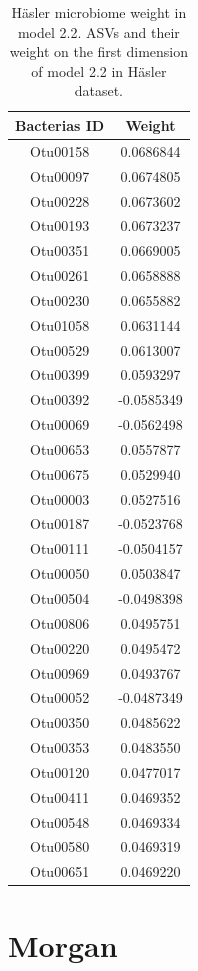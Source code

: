 \documentclass[
  12pt,
  a4paper,
  twoside,
  openright]{book}
\begin{document}
\begin{longtable}[t]{cc}
\caption[Häsler microbiome weight in model 2.2]{\label{tab:hasler-microbiome-2-2}Häsler microbiome weight in model 2.2. ASVs and their weight on the first dimension of model 2.2 in Häsler dataset.}\\
\toprule
Bacterias ID & Weight\\
\midrule
Otu00158 & 0.0686844\\
Otu00097 & 0.0674805\\
Otu00228 & 0.0673602\\
Otu00193 & 0.0673237\\
Otu00351 & 0.0669005\\
\addlinespace
Otu00261 & 0.0658888\\
Otu00230 & 0.0655882\\
Otu01058 & 0.0631144\\
Otu00529 & 0.0613007\\
Otu00399 & 0.0593297\\
\addlinespace
Otu00392 & -0.0585349\\
Otu00069 & -0.0562498\\
Otu00653 & 0.0557877\\
Otu00675 & 0.0529940\\
Otu00003 & 0.0527516\\
\addlinespace
Otu00187 & -0.0523768\\
Otu00111 & -0.0504157\\
Otu00050 & 0.0503847\\
Otu00504 & -0.0498398\\
Otu00806 & 0.0495751\\
\addlinespace
Otu00220 & 0.0495472\\
Otu00969 & 0.0493767\\
Otu00052 & -0.0487349\\
Otu00350 & 0.0485622\\
Otu00353 & 0.0483550\\
\addlinespace
Otu00120 & 0.0477017\\
Otu00411 & 0.0469352\\
Otu00548 & 0.0469334\\
Otu00580 & 0.0469319\\
Otu00651 & 0.0469220\\
\bottomrule
\end{longtable}

\hypertarget{morgan}{%
\section{Morgan}\label{morgan}}
\end{document}

